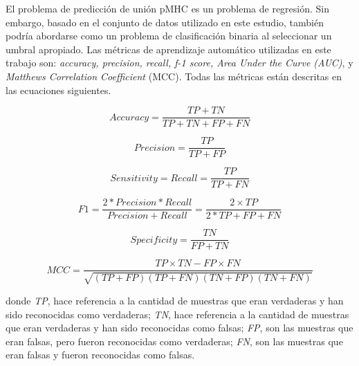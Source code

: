 El problema de predicción de unión pMHC es un problema de regresión. Sin embargo, basado en el conjunto de datos utilizado en este estudio, también podría abordarse como un problema de clasificación binaria al seleccionar un umbral apropiado. Las métricas de aprendizaje automático utilizadas en este trabajo son: \textit{accuracy, precision, recall, f-1 score, Area Under the Curve (AUC)}, y \textit{Matthews Correlation Coefficient} (MCC). Todas las métricas están descritas en las ecuaciones siguientes.

\begin{equation}\label{equa:acc}
	Accuracy = \frac{TP+TN}{TP+TN+FP+FN}
\end{equation}

\begin{equation}\label{equa:precision}
	Precision = \frac{TP}{TP+FP}
\end{equation}

\begin{equation}\label{equa:recall}
	Sensitivity = Recall = \frac{TP}{TP+FN}
\end{equation}

\begin{equation}\label{equa:f1}
	F1 = \frac{2*Precision*Recall}{Precision+Recall} = \frac{2 \times TP}{2*TP+FP+FN}
\end{equation}


\begin{equation}\label{equa:FPR}
	Specificity = \frac{TN}{FP+TN}
\end{equation}

\begin{equation}\label{equa:MCC}
	MCC = \frac{TP \times TN - FP \times FN}{ \sqrt{ (TP+FP)(TP  + FN)(TN+FP)(TN+FN)}  }
\end{equation}

donde \textit{TP}, hace referencia a la cantidad de muestras que eran verdaderas y han sido reconocidas como verdaderas; \textit{TN}, hace referencia a la cantidad de muestras que eran verdaderas y han sido reconocidas como falsas; \textit{FP}, son las muestras que eran falsas, pero fueron reconocidas como verdaderas; \textit{FN}, son las muestras que eran falsas y fueron reconocidas como falsas.
